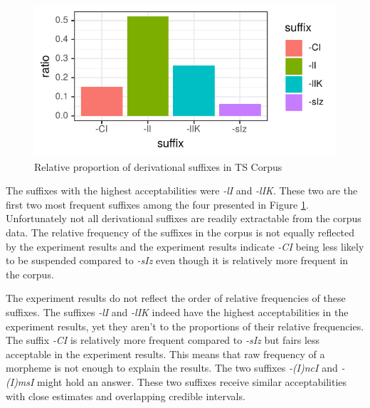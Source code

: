 \begin{knitrout}
\color{fgcolor}\begin{figure}[hbt!]

{\centering \includegraphics[]{experiments/acceptability/report/figure/suffixcorpus-1.pdf} 

}

\caption[Relative proportion of derivational suffixes in TS Corpus]{Relative proportion of derivational suffixes in TS Corpus}\label{fig:suffixcorpus}
\end{figure}


\end{knitrout}

The suffixes with the highest acceptabilities were \textit{-lI} and \textit{-lIK}. These two are the first two most frequent suffixes among the four presented in Figure \ref{fig:suffixcorpus}. Unfortunately not all derivational suffixes are readily extractable from the corpus data. The relative frequency of the suffixes in the corpus is not equally reflected by the experiment results and the experiment results indicate \textit{-CI} being less likely to be suspended compared to \textit{-sIz} even though it is relatively more frequent in the corpus.

The experiment results do not reflect the order of relative frequencies of these suffixes. The suffixes \textit{-lI} and \textit{-lIK} indeed have the highest acceptabilities in the experiment results, yet they aren't to the proportions of their relative frequencies. The suffix \textit{-CI} is relatively more frequent compared to \textit{-sIz} but fairs less acceptable in the experiment results. This means that raw frequency of a morpheme is not enough to explain the results. The two suffixes \textit{-(I)ncI} and \textit{-(I)msI} might hold an answer. These two suffixes receive similar acceptabilities with close estimates and overlapping credible intervals. 

